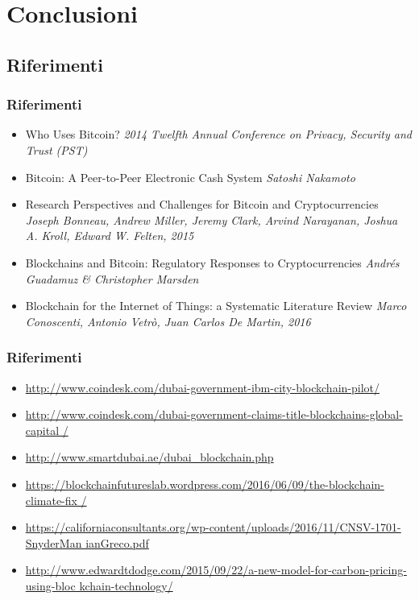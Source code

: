 \section*{Conclusioni}
\subsection*{Riferimenti}
\begin{frame}
  \frametitle{Riferimenti}

  \begin{itemize}
   \item Who Uses Bitcoin? \emph{2014 Twelfth Annual Conference on Privacy, 
Security and Trust (PST)}
   \item Bitcoin: A Peer-to-Peer Electronic Cash System \emph{Satoshi Nakamoto}
   \item Research Perspectives and Challenges for Bitcoin and Cryptocurrencies 
\emph{Joseph Bonneau, Andrew Miller, Jeremy Clark, Arvind Narayanan, Joshua A. 
Kroll, Edward W. Felten, 2015}
   \item Blockchains and Bitcoin: Regulatory Responses to Cryptocurrencies 
\emph{Andrés Guadamuz \& Christopher Marsden}
   \item Blockchain for the Internet of Things: a Systematic
Literature Review \emph{Marco Conoscenti, Antonio Vetrò, Juan Carlos De
Martin, 2016}
  \end{itemize}

\end{frame}


\begin{frame}
  \frametitle{Riferimenti}

  \begin{itemize}
   \item
\url{http://www.coindesk.com/dubai-government-ibm-city-blockchain-pilot/}
\item
\url{
http://www.coindesk.com/dubai-government-claims-title-blockchains-global-capital
/}
\item \url{http://www.smartdubai.ae/dubai_blockchain.php}
\item
\url{
https://blockchainfutureslab.wordpress.com/2016/06/09/the-blockchain-climate-fix
/}
\item
\url{
https://californiaconsultants.org/wp-content/uploads/2016/11/CNSV-1701-SnyderMan
ianGreco.pdf}
\item
\url{
http://www.edwardtdodge.com/2015/09/22/a-new-model-for-carbon-pricing-using-bloc
kchain-technology/}
  \end{itemize}

\end{frame}
